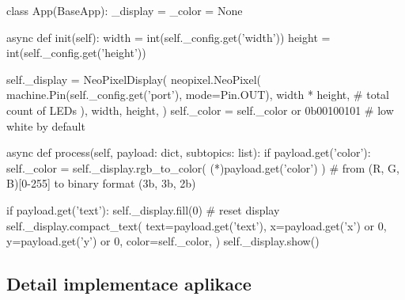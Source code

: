 \begin{code}[
    language=Python,
    caption={Ukázka z implementace výstupní aplikace -- v korutině \ic{init} aplikace připraví ovladač na základě
    parametrů doručených z editoru. Korutina \ic{process} zodpovědná za zpracování příchozí zprávy následně tento
    ovladač řídí -- dle nastavené barvy a textu odešle požadavek na displej.},
    label=code:np-display-app
]
class App(BaseApp):
    _display = _color = None

    async def init(self):
        width = int(self._config.get('width'))
        height = int(self._config.get('height'))

        self._display = NeoPixelDisplay(
            neopixel.NeoPixel(
                machine.Pin(self._config.get('port'), mode=Pin.OUT),
                width * height,  # total count of LEDs
            ),
            width, height,
        )
        self._color = self._color or 0b00100101  # low white by default

    async def process(self, payload: dict, subtopics: list):
        if payload.get('color'):
            self._color = self._display.rgb_to_color(
                (*\textasteriskcentered*)payload.get('color')
            )  # from (R, G, B)[0-255] to binary format (3b, 3b, 2b)

        if payload.get('text'):
            self._display.fill(0)  # reset display
            self._display.compact_text(
                text=payload.get('text'),
                x=payload.get('x') or 0,
                y=payload.get('y') or 0,
                color=self._color,
            )
            self._display.show()

\end{code}

\subsection{Detail implementace aplikace}


